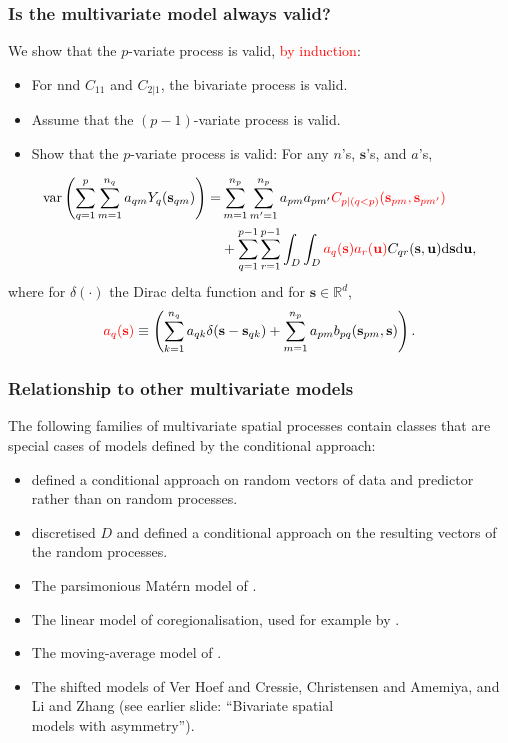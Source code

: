 \documentclass{beamer}
\newcommand{\intd} {\mathrm{d}}
\newcommand{\svec} {\textbf{s}}
\newcommand{\uvec} {\textbf{u}}
\newcommand{\s}{\mathbf{s}}
\newcommand{\var}{\mathrm{var}}
\newcommand{\red}{\textcolor{red}}%
\begin{document}

\begin{frame}
\frametitle{Is the multivariate model always valid?}

We show that the $p$-variate process is valid, \textcolor{red}{by induction}:
\begin{itemize}
  \item For nnd $C_{11}$ and $C_{2|1}$, the bivariate process is valid.
  \item Assume that the $(p-1)$-variate process is valid.
  \item Show that the $p$-variate process is valid: For any $n$'s, $\s$'s, and $a$'s,
\end{itemize}

\vspace{-0.3in}
\begin{align*}
\var\left(\sum_{q=1}^p \sum_{m=1}^{n_q} a_{qm}Y_q(\svec_{qm})\right)=& \sum_{m=1}^{n_p}\sum_{m'=1}^{n_p}a_{pm}a_{pm'}\textcolor{red}{C_{p \mid  (q < p)}(\svec_{pm},\svec_{pm'})} \\
&+ \sum_{q=1}^{p-1}\sum_{r=1}^{p-1}\int_D\int_D\red{a_q(\svec)a_r(\uvec)}C_{qr}(\svec,\uvec)\intd \svec \intd \uvec,
\end{align*}
where for $\delta(\cdot)$ the Dirac delta function and for $\s\in\mathbb{R}^d$,
\begin{equation*}
\red{a_q(\svec)} \equiv \left(\sum_{k=1}^{n_q}a_{qk}\delta(\svec - \svec_{qk}) + \sum_{m=1}^{n_p}a_{pm}b_{pq}(\svec_{pm},\svec)\right).
\end{equation*}
\end{frame}


\begin{frame}
\frametitle{Relationship to other multivariate models}
The following families of multivariate spatial processes contain classes that are special cases of models defined by the conditional approach:

\begin{itemize}
\item \cite{RoyleBerliner1999} defined a conditional approach on random vectors of data and predictor rather than on random processes.
\item \cite{CressieWikle2011} discretised $D$ and defined a conditional approach on the resulting vectors of the random processes.
\item The parsimonious Mat{\'e}rn model of \cite{Gneitingetal2010}.\vfil
\item The linear model of coregionalisation, used for example by \cite{Wackernagel1995}.\vfil
\item The moving-average model of \cite{verHoef_1998}.\vfil
\item The shifted models of Ver Hoef and Cressie, Christensen and Amemiya, and Li and Zhang (see earlier slide: ``Bivariate spatial \\models with asymmetry'').
\end{itemize}
\vfill
\end{frame}
\end{document}
